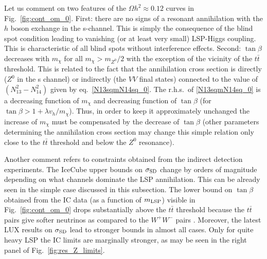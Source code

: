 \documentclass[12pt,twoside]{article}
\begin{document}
Let us comment on two features of the $\Omega h^2\approx0.12$ curves in 
Fig.~\ref{fig:cont_om_0}. First: there are no signs of a resonant 
annihilation with the $h$ boson exchange in the s-channel. 
This is simply the consequence of the blind spot condition 
leading to vanishing (or at least very small) LSP-Higgs coupling. 
This is characteristic of all blind spots without interference effects. 
Second: $\tan\beta$ decreases with $m_\chi$ for all $m_\chi>m_{Z^0}/2$ 
with the exception of the vicinity of the $t\bar{t}$ threshold. 
This is related to the fact that the annihilation cross section 
is directly ($Z^0$ in the s channel) or indirectly (the $VV$ final states) 
connected to the value of $(N_{13}^2-N_{14}^2)$ given by 
eq.~\eqref{N13sqmN14sq_0}. The r.h.s.\ of \eqref{N13sqmN14sq_0} is 
a decreasing function of $m_\chi$ and decreasing function of $\tan\beta$ 
(for $\tan\beta>1+\lambda v_h/m_\chi$). Thus, in order to keep it approximately 
unchanged the increase of $m_\chi$ must be compensated by the decrease 
of $\tan\beta$ (other parameters determining the annihilation cross section 
may change this simple relation only close to the $t\bar{t}$ threshold 
and below the $Z^0$ resonance).


Another comment refers to constraints obtained from
the indirect detection experiments. 
The IceCube upper bounds on $\sigma_{\rm SD}$ change by orders of magnitude 
depending on what channels dominate the LSP annihilation. This can be already 
seen in the simple case discussed in this subsection. The lower bound on 
$\tan\beta$ obtained from the IC data (as a function of $m_{\rm LSP}$) 
visible in Fig.~\ref{fig:cont_om_0} 
drops substantially above the $t\bar{t}$ threshold because the $t\bar{t}$ 
pairs give softer neutrinos as compared to the $W^+W^-$ pairs 
\cite{IceCubeNEW}. Moreover, the latest LUX results on $\sigma_{\rm SD}$ 
lead to stronger bounds in almost all cases. Only for quite heavy LSP
the IC limits are marginally stronger, as may be seen 
in the right panel of Fig.~\ref{fig:res_Z_limits}.
\end{document}
